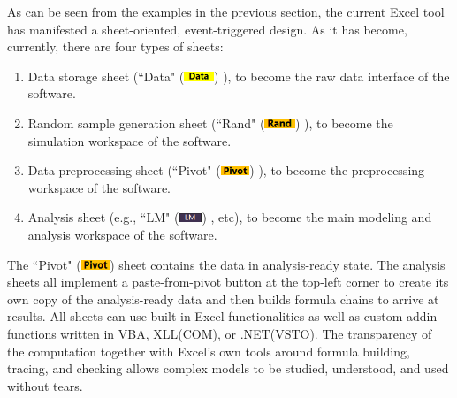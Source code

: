 \documentclass[article]{jss}
\numberwithin{equation}{subsection}
\newcommand{\shtData}{``Data" (\includegraphics[height=8pt, keepaspectratio=true]{DataSheetTab_png}) }
\newcommand{\shtRand}{``Rand" (\includegraphics[height=8pt, keepaspectratio=true]{RandSheetTab_png}) }
\newcommand{\shtPivot}{``Pivot" (\includegraphics[height=8pt, keepaspectratio=true]{PivotSheetTab_png}) }
\newcommand{\shtLM}{``LM" (\includegraphics[height=8pt, keepaspectratio=true]{LMSheetTab_png}) }
\begin{document}
        As can be seen from the examples in the previous section, the current Excel tool has manifested a sheet-oriented, event-triggered design. As it has become, currently, there are four types of sheets:
        \begin{enumerate}
        \item Data storage sheet (\shtData), to become the raw data interface of the software.
        \item Random sample generation sheet (\shtRand), to become the simulation workspace of the software.
        \item Data preprocessing sheet (\shtPivot), to become the preprocessing workspace of the software.
        \item Analysis sheet (e.g., \shtLM, etc), to become the main modeling and analysis workspace of the software.
        \end{enumerate}
        The \shtPivot sheet contains the data in analysis-ready state. The analysis sheets all implement a paste-from-pivot button at the top-left corner to create its own copy of the analysis-ready data and then builds formula chains to arrive at results. All sheets can use built-in Excel functionalities as well as custom addin functions written in VBA, XLL(COM), or .NET(VSTO). The transparency of the computation together with Excel's own tools around formula building, tracing, and checking allows complex models to be studied, understood, and used without tears.
        
        
        
\end{document}
